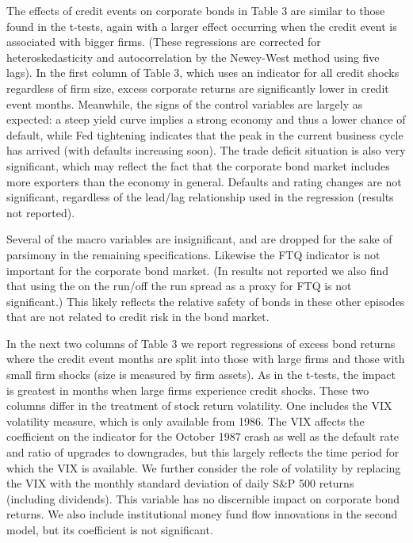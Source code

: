 \documentclass[titlepage,11pt]{article}
\begin{document}
The effects of credit events on corporate bonds in Table 3 are
similar to those found in the t-tests, again with a larger effect
occurring when the credit event is associated with bigger firms.
(These regressions are corrected for heteroskedasticity and
autocorrelation by the Newey-West method using five lags).  In the
first column of Table 3, which uses an indicator for all credit
shocks regardless of firm size, excess corporate returns are
significantly lower in credit event months. Meanwhile,
the signs of the control variables are largely as expected:  a steep
yield curve implies a strong economy and thus a lower chance of
default, while Fed tightening indicates that the peak in the current
business cycle has arrived (with defaults increasing soon). The
trade deficit situation is also very significant, which may reflect
the fact that the corporate bond market includes more exporters than
the economy in general. Defaults and rating changes are not
significant, regardless of the lead/lag relationship used in the
regression (results not reported).

Several of the macro variables are insignificant, and are dropped
for the sake of parsimony in the remaining specifications.
Likewise the FTQ indicator is not important for
the corporate bond market. (In results not reported we also find
that using the on the run/off the run spread as a proxy for FTQ is not
significant.)
This likely reflects the relative safety of bonds in these other episodes that
are
not related to credit risk in the bond market.

In the next two columns of Table 3 we report regressions of excess
bond returns where the credit event months are split into those with
large firms and those with small firm shocks (size is measured by
firm assets). As in the t-tests, the impact is greatest in months
when large firms experience credit shocks. These two columns differ
in the treatment of stock return volatility.  One includes the
VIX volatility measure, which is only available from 1986. The VIX affects
the coefficient on the indicator for the October 1987 crash  as well as
the default rate and ratio of upgrades to downgrades, but this largely reflects
the time period for which the VIX is available.  We further
consider the role of volatility by replacing the VIX with the monthly
standard deviation of daily S\&P 500 returns (including dividends).
This variable has no discernible impact on corporate bond
returns.  We also include institutional money fund flow innovations in the
second
model, but its coefficient is not significant.
\end{document}
